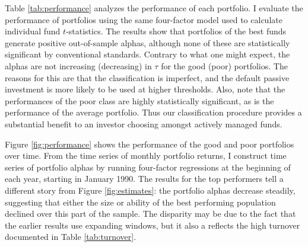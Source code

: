 		Table \ref{tab:performance} analyzes the performance of each portfolio. I evaluate the performance of portfolios using the same four-factor model used to calculate individual fund $t$-statistics.  The results show that portfolios of the best funds generate positive out-of-sample alphas, although none of these are statistically significant by conventional standards.  Contrary to what one might expect, the alphas are not increasing (decreasing) in $\tau$ for the good (poor) portfolios.  The reasons for this are that the classification is imperfect, and the default passive investment is more likely to be used at higher thresholds. Also, note that the performances of the poor class are highly statistically significant, as is the performance of the average portfolio.  Thus our classification procedure provides a substantial benefit to an investor choosing amongst actively managed funds.

		Figure \ref{fig:performance} shows the performance of the good and poor portfolios over time. From the time series of monthly portfolio returns, I construct time series of portfolio alphas by running four-factor regressions at the beginning of each year, starting in January 1990.  The results for the top performers tell a different story from Figure \ref{fig:estimates}: the portfolio alphas decrease steadily, suggesting that either the size or ability of the best performing population declined over this part of the sample.  The disparity may be due to the fact that the earlier results use expanding windows, but it also a reflects the high turnover documented in Table \ref{tab:turnover}.

